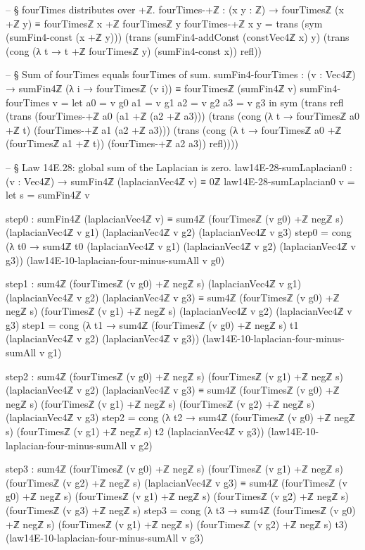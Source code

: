 \documentclass[11pt,a4paper]{book}
\begin{document}
\begin{code}
-- § fourTimes distributes over +ℤ.
fourTimes-+ℤ : (x y : ℤ) → fourTimesℤ (x +ℤ y) ≡ fourTimesℤ x +ℤ fourTimesℤ y
fourTimes-+ℤ x y =
  trans
    (sym (sumFin4-const (x +ℤ y)))
    (trans
      (sumFin4-addConst (constVec4ℤ x) y)
      (trans
        (cong (λ t → t +ℤ fourTimesℤ y) (sumFin4-const x))
        refl))

-- § Sum of fourTimes equals fourTimes of sum.
sumFin4-fourTimes : (v : Vec4ℤ) →
  sumFin4ℤ (λ i → fourTimesℤ (v i)) ≡ fourTimesℤ (sumFin4ℤ v)
sumFin4-fourTimes v =
  let
    a0 = v g0
    a1 = v g1
    a2 = v g2
    a3 = v g3
  in
  sym
    (trans
      refl
      (trans
        (fourTimes-+ℤ a0 (a1 +ℤ (a2 +ℤ a3)))
        (trans
          (cong (λ t → fourTimesℤ a0 +ℤ t) (fourTimes-+ℤ a1 (a2 +ℤ a3)))
          (trans
            (cong (λ t → fourTimesℤ a0 +ℤ (fourTimesℤ a1 +ℤ t)) (fourTimes-+ℤ a2 a3))
            refl))))

-- § Law 14E.28: global sum of the Laplacian is zero.
law14E-28-sumLaplacian0 : (v : Vec4ℤ) →
  sumFin4ℤ (laplacianVec4ℤ v) ≡ 0ℤ
law14E-28-sumLaplacian0 v =
  let
    s = sumFin4ℤ v

    step0 :
      sumFin4ℤ (laplacianVec4ℤ v) ≡
      sum4ℤ (fourTimesℤ (v g0) +ℤ negℤ s) (laplacianVec4ℤ v g1) (laplacianVec4ℤ v g2) (laplacianVec4ℤ v g3)
    step0 =
      cong
        (λ t0 → sum4ℤ t0 (laplacianVec4ℤ v g1) (laplacianVec4ℤ v g2) (laplacianVec4ℤ v g3))
        (law14E-10-laplacian-four-minus-sumAll v g0)

    step1 :
      sum4ℤ (fourTimesℤ (v g0) +ℤ negℤ s) (laplacianVec4ℤ v g1) (laplacianVec4ℤ v g2) (laplacianVec4ℤ v g3) ≡
      sum4ℤ (fourTimesℤ (v g0) +ℤ negℤ s) (fourTimesℤ (v g1) +ℤ negℤ s) (laplacianVec4ℤ v g2) (laplacianVec4ℤ v g3)
    step1 =
      cong
        (λ t1 → sum4ℤ (fourTimesℤ (v g0) +ℤ negℤ s) t1 (laplacianVec4ℤ v g2) (laplacianVec4ℤ v g3))
        (law14E-10-laplacian-four-minus-sumAll v g1)

    step2 :
      sum4ℤ (fourTimesℤ (v g0) +ℤ negℤ s) (fourTimesℤ (v g1) +ℤ negℤ s) (laplacianVec4ℤ v g2) (laplacianVec4ℤ v g3) ≡
      sum4ℤ (fourTimesℤ (v g0) +ℤ negℤ s) (fourTimesℤ (v g1) +ℤ negℤ s) (fourTimesℤ (v g2) +ℤ negℤ s) (laplacianVec4ℤ v g3)
    step2 =
      cong
        (λ t2 → sum4ℤ (fourTimesℤ (v g0) +ℤ negℤ s) (fourTimesℤ (v g1) +ℤ negℤ s) t2 (laplacianVec4ℤ v g3))
        (law14E-10-laplacian-four-minus-sumAll v g2)

    step3 :
      sum4ℤ (fourTimesℤ (v g0) +ℤ negℤ s) (fourTimesℤ (v g1) +ℤ negℤ s) (fourTimesℤ (v g2) +ℤ negℤ s) (laplacianVec4ℤ v g3) ≡
      sum4ℤ (fourTimesℤ (v g0) +ℤ negℤ s) (fourTimesℤ (v g1) +ℤ negℤ s) (fourTimesℤ (v g2) +ℤ negℤ s) (fourTimesℤ (v g3) +ℤ negℤ s)
    step3 =
      cong
        (λ t3 → sum4ℤ (fourTimesℤ (v g0) +ℤ negℤ s) (fourTimesℤ (v g1) +ℤ negℤ s) (fourTimesℤ (v g2) +ℤ negℤ s) t3)
        (law14E-10-laplacian-four-minus-sumAll v g3)


\end{code}
\end{document}
